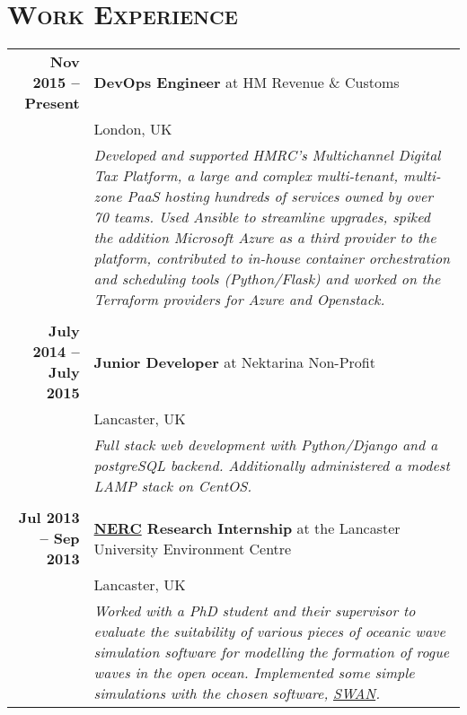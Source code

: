 \documentclass[a4paper,10pt]{article} %
\begin{document}
\section{\textsc{Work Experience}}
\centering
\begin{tabularx}{\textwidth}{r|X}
\textbf{Nov 2015 -- Present}       & \textbf{DevOps Engineer} at HM Revenue \& Customs \\
                                   & London, UK \\
                                   & \footnotesize\emph{Developed and supported HMRC's Multichannel Digital Tax Platform, a large and complex multi-tenant, multi-zone PaaS hosting hundreds of services owned by over 70 teams. Used Ansible to streamline upgrades, spiked the addition Microsoft Azure as a third provider to the platform, contributed to in-house container orchestration and scheduling tools (Python/Flask) and worked on the Terraform providers for Azure and Openstack.} \\
\multicolumn{2}{r}{} \\ %
\textbf{July 2014 -- July 2015}    & \textbf{Junior Developer} at {Nektarina Non-Profit}\\
                                   & Lancaster, UK\\
                                   & \footnotesize\emph{Full stack web development with Python/Django and a postgreSQL backend. Additionally administered a modest LAMP stack on CentOS.}\\
\multicolumn{2}{r}{} \\ %
\textbf{Jul 2013 --  Sep 2013}     & \textbf{\href{http://www.nerc.ac.uk/}{NERC} Research Internship} at the Lancaster University Environment Centre \\
                                   & Lancaster, UK \\
                                   & \footnotesize\emph{Worked with a PhD student and their supervisor to evaluate the suitability of various pieces of oceanic wave simulation software for modelling the formation of rogue waves in the open ocean. Implemented some simple simulations with the chosen software, \href{http://swanmodel.sourceforge.net/}{SWAN}.}                           
\end{tabularx}

\end{document}
